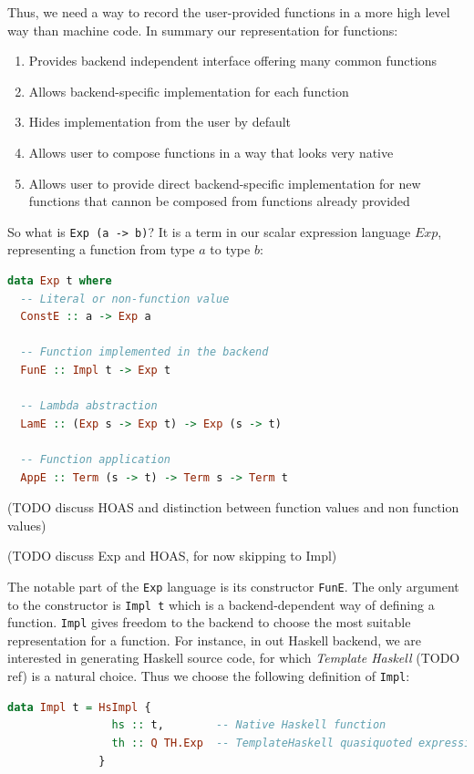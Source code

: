 \documentclass[preamble.tex]{subfiles}
\begin{document}
Thus, we need a way to record the user-provided functions in a more high level way than machine code. In summary our representation for functions:
\begin{enumerate}
\item Provides backend independent interface offering many common functions
\item Allows backend-specific implementation for each function
\item Hides implementation from the user by default
\item Allows user to compose functions in a way that looks very native
\item Allows user to provide direct backend-specific implementation for new functions that cannon be composed from functions already provided
\end{enumerate}


So what is \texttt{Exp (a -> b)}? It is a term in our scalar expression language $Exp$, representing a function from type $a$ to type $b$:
\begin{lstlisting}[basicstyle={\ttfamily},language=Haskell]
data Exp t where
  -- Literal or non-function value
  ConstE :: a -> Exp a

  -- Function implemented in the backend
  FunE :: Impl t -> Exp t

  -- Lambda abstraction
  LamE :: (Exp s -> Exp t) -> Exp (s -> t)

  -- Function application
  AppE :: Term (s -> t) -> Term s -> Term t
\end{lstlisting}

(TODO discuss HOAS and distinction between function values and non function values)

(TODO discuss Exp and HOAS, for now skipping to Impl)

The notable part of the \texttt{Exp} language is its constructor \texttt{FunE}. The only argument to the constructor is \texttt{Impl t} which is a backend-dependent way of defining a function. \texttt{Impl} gives freedom to the backend to choose the most suitable representation for a function. For instance, in out Haskell backend, we are interested in generating Haskell source code, for which \emph{Template Haskell} (TODO ref) is a natural choice. Thus we choose the following definition of \texttt{Impl}:
\begin{lstlisting}[basicstyle={\ttfamily},language=Haskell]
data Impl t = HsImpl {
                hs :: t,        -- Native Haskell function
                th :: Q TH.Exp  -- TemplateHaskell quasiquoted expression
              } 
\end{lstlisting}
\end{document}
